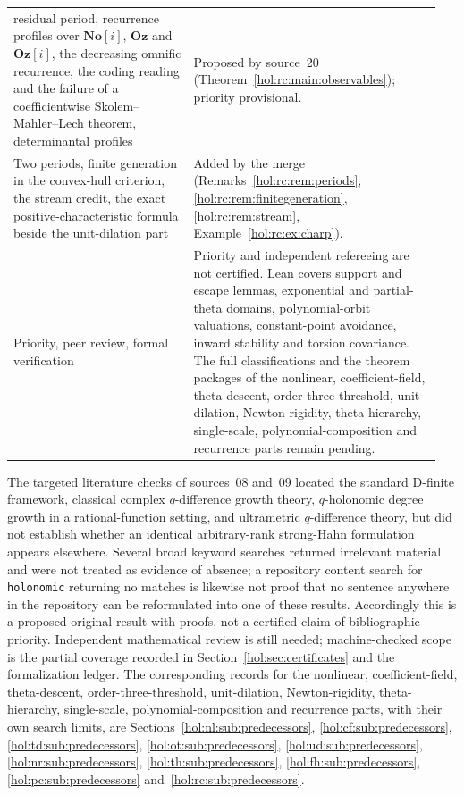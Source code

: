 \documentclass[11pt]{article}
\numberwithin{equation}{section}
\theoremstyle{definition}
\theoremstyle{remark}
\newcommand{\No}{\mathbf{No}}
\newcommand{\Oz}{\mathbf{Oz}}
\begin{document}
\begin{longtable}{@{}>{\raggedright\arraybackslash}p{0.40\linewidth}
                    >{\raggedright\arraybackslash}p{0.55\linewidth}@{}}
residual period, recurrence profiles over $\No[i]$, $\Oz$ and $\Oz[i]$, the
decreasing omnific recurrence, the coding reading and the failure of a
coefficientwise Skolem--Mahler--Lech theorem, determinantal profiles &
Proposed by source~20 (Theorem~\ref{hol:rc:main:observables}); priority
provisional.\\[4pt]
Two periods, finite generation in the convex-hull criterion, the stream credit,
the exact positive-characteristic formula beside the unit-dilation part &
Added by the merge (Remarks~\ref{hol:rc:rem:periods},
\ref{hol:rc:rem:finitegeneration}, \ref{hol:rc:rem:stream},
Example~\ref{hol:rc:ex:charp}).\\[4pt]
Priority, peer review, formal verification & Priority and independent
refereeing are not certified. Lean covers support and escape lemmas,
exponential and partial-theta domains, polynomial-orbit valuations,
constant-point avoidance, inward stability and torsion covariance.
The full classifications and the theorem packages of the nonlinear,
coefficient-field, theta-descent, order-three-threshold, unit-dilation,
Newton-rigidity, theta-hierarchy, single-scale, polynomial-composition and
recurrence parts remain pending.\\
\bottomrule
\end{longtable}

The targeted literature checks of sources~08 and~09 located the standard
D-finite framework,
classical complex $q$-difference growth theory, $q$-holonomic degree growth in
a rational-function setting, and ultrametric $q$-difference theory, but did
not establish whether an identical arbitrary-rank strong-Hahn formulation
appears elsewhere. Several broad keyword searches returned irrelevant material
and were not treated as evidence of absence; a repository content search for
\texttt{holonomic} returning no matches is likewise not proof that no sentence
anywhere in the repository can be reformulated into one of these results.
Accordingly this is a proposed original result with proofs, not a certified
claim of bibliographic priority. Independent mathematical review is still
needed; machine-checked scope is the partial coverage recorded in
Section~\ref{hol:sec:certificates} and the formalization ledger. The
corresponding records for the nonlinear, coefficient-field,
theta-descent, order-three-threshold, unit-dilation, Newton-rigidity,
theta-hierarchy, single-scale, polynomial-composition and recurrence parts,
with their own search limits, are Sections~\ref{hol:nl:sub:predecessors},
\ref{hol:cf:sub:predecessors}, \ref{hol:td:sub:predecessors},
\ref{hol:ot:sub:predecessors}, \ref{hol:ud:sub:predecessors},
\ref{hol:nr:sub:predecessors}, \ref{hol:th:sub:predecessors},
\ref{hol:fh:sub:predecessors}, \ref{hol:pc:sub:predecessors}
and~\ref{hol:rc:sub:predecessors}.
\end{document}
